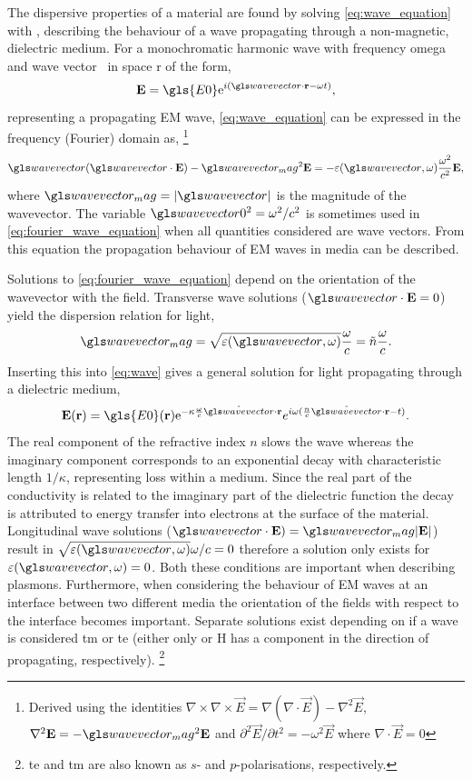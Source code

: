 \documentclass{article}
\begin{document}
The dispersive properties of a material are found by solving \eqref{eq:wave_equation} with \dielectric, describing the behaviour of a wave propagating through a non-magnetic, dielectric medium. For a monochromatic harmonic wave with frequency \gls{omega} and wave vector \wv\ in space \gls{r} of the form,
\begin{equation}
\vec{E} = \gls{E0} \e^{i(\wv \cdot \vec{r} - \omega t)},
\label{eq:wave}
\end{equation}
representing a propagating EM wave, \eqref{eq:wave_equation} can be expressed in the frequency (Fourier) domain as,%
%
\footnote{Derived using the identities $\nabla \times \nabla \times \vec{E} = \nabla(\nabla\cdot\vec{E}) - \nabla^2\vec{E}$, $\nabla^2\vec{E}=-\wvm^2\vec{E}$ and $\partial^2\vec{E}/\partial t^2 = -\omega^2\vec{E}$ where $\nabla\cdot\vec{E}=0$}
%
\begin{equation}
\wv(\wv\cdot\vec{E}) - \wvm^2\vec{E} = -\eps(\wv, \omega) \frac{\omega^2}{c^2}\vec{E},
\label{eq:fourier_wave_equation}
\end{equation}
where $\wvm=|\wv|$ is the magnitude of the wavevector. The variable $\wvz^2 = \omega^2/c^2$ is sometimes used in \eqref{eq:fourier_wave_equation} when all quantities considered are wave vectors. From this equation the propagation behaviour of EM waves in media can be described.

Solutions to \eqref{eq:fourier_wave_equation} depend on the orientation of the wavevector with the field. Transverse wave solutions ($\wv\cdot\vec{E}=0$) yield the dispersion relation for light,
\begin{equation} \wvm = \sqrt{\eps(\wv, \omega)}\frac{\omega}{c}=\refind\frac{\omega}{c}. \end{equation}
Inserting this into \eqref{eq:wave} gives a general solution for light propagating through a dielectric medium,
\begin{equation}
\vec{E}(\vec{r}) = \gls{E0}(\vec{r}) \e^{-\kappa\frac{\omega}{c}\hat{\wv}\cdot\vec{r}} e^{i\omega(\frac{n}{c} \hat{\wv}\cdot\vec{r} - t)}.
\label{eq:gen_wave_solution}
\end{equation}
The real component of the refractive index $n$ slows the wave whereas the imaginary component corresponds to an exponential decay with characteristic length $1/\kappa$, representing loss within a medium. Since the real part of the conductivity is related to the imaginary part of the dielectric function the decay is attributed to energy transfer into electrons at the surface of the material.
Longitudinal wave solutions ($\wv\cdot\vec{E}) = \wvm|\vec{E}|$) result in $\sqrt{\eps(\wv,\omega)}\omega/c = 0$ therefore a solution only exists for $\eps(\wv, \omega)=0$. Both these conditions are important when describing plasmons.
Furthermore, when considering the behaviour of EM waves at an interface between two different media the orientation of the fields with respect to the interface becomes important. Separate solutions exist depending on if a wave is considered \gls{tm} or \gls{te} (either only  or \gls{H} has a component in the direction of propagating, respectively).%
\footnote{\gls{te} and \gls{tm} are also known as $s$- and $p$-polarisations, respectively.}
\end{document}
